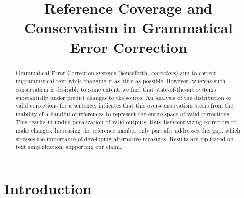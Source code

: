 \documentclass[letterpaper, 11pt]{article}
\begin{document}
\title{Reference Coverage and Conservatism in Grammatical Error Correction}
\maketitle

\begin{abstract}
  Grammatical Error Correction systems (henceforth, {\it correctors}) aim to
  correct ungrammatical text while changing it as little as possible.
  However, whereas such conservatism is desirable to some extent,
  we find that state-of-the-art systems substantially under-predict
  changes to the source. 
  An analysis of the distribution of valid corrections for a sentence,   
  indicates that this over-conservatism stems from
  the inability of a handful of references to represent the entire space of valid
  corrections. This results in undue penalization of valid outputs,
  thus disincentivizing correctors to make changes.
  Increasing the reference number only partially addresses this gap,
  which stresses the importance of developing alternative measures.
  Results are replicated on text simplification, supporting our claim.
\end{abstract}

\section{Introduction}
\end{document}
